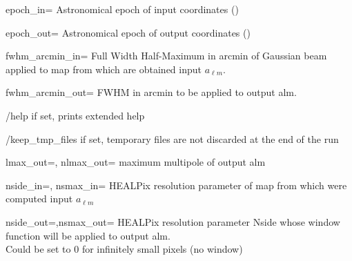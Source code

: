 \begin{keywords}
\begin{kwlist}{}
 \item[epoch\_in=]      Astronomical epoch of input coordinates 
()
 \item[epoch\_out=]     Astronomical epoch of output coordinates 
()

 \item[fwhm\_arcmin\_in=]   Full Width
Half-Maximum in arcmin of Gaussian beam applied to map from which are obtained
input $a_{\ell m}$.\\

 \item[fwhm\_arcmin\_out=]  FWHM in
arcmin to be applied to output alm.\\ 

 \item[/help]       if set, prints extended help
\item[/keep\_tmp\_files]  if set,
temporary files are not discarded at the end of the run

 \item[lmax\_out=, nlmax\_out=]    
 maximum multipole of output alm

 \item[nside\_in=, nsmax\_in=]     
HEALPix resolution parameter of map
                  from which were computed input $a_{\ell m}$

 \item[nside\_out=,nsmax\_out=]    
HEALPix resolution parameter Nside whose
                  window function will be applied to output alm.\\
                  Could be set to 0 for infinitely small pixels (no window)


\end{kwlist}
\end{keywords}
